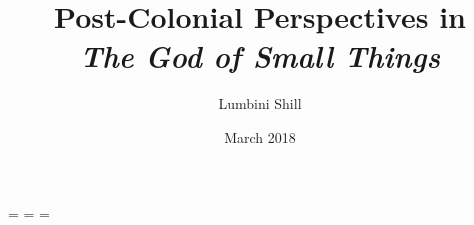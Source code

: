 \documentclass[fontsize=13bp,oneside,print]{thesis}
\title{Post-Colonial Perspectives in\protect\\\textit{The God of Small Things}}
\author{Lumbini Shill}
\date{March 2018}
\begin{document}


\newdimen\origiwspc
\newdimen\origiwstr
\origiwspc=\font %
\origiwstr=\font %
\font=\origiwstr
{}\origiwspc %



\end{document}
